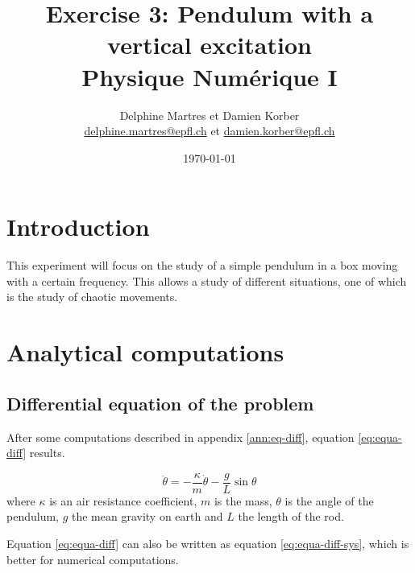 \documentclass[a4paper,12pt,twoside]{article}
\newcommand{\mail}[1]{{\href{mailto:#1}{#1}}}
\begin{document}
\title{Exercise 3: Pendulum with a vertical excitation\\{\small Physique Numérique I}}
\date{\today}
\author{Delphine Martres et Damien Korber\\{\small \mail{delphine.martres@epfl.ch} et \mail{damien.korber@epfl.ch}}}
\maketitle
\tableofcontents %
\newpage %
\baselineskip=16pt
\parindent=15pt
\parskip=5pt




\section{Introduction}
This experiment will focus on the study of a simple pendulum in a box moving with a certain frequency.
This allows a study of different situations, one of which is the study of chaotic movements.

\section{Analytical computations}
\subsection{Differential equation of the problem}
After some computations described in appendix \ref{ann:eq-diff}, equation \ref{eq:equa-diff} results.%

\begin{equation}
	\ddot{\theta} = -\frac{\kappa}{m}\dot{\theta} - \frac{g}{L}\sin\theta
	\label{eq:equa-diff}
\end{equation}
where $\kappa$ is an air resistance coefficient, $m$ is the mass, $\theta$ is the angle of the pendulum, $g$ the mean gravity on earth and $L$ the length of the rod.

Equation \ref{eq:equa-diff} can also be written as equation \ref{eq:equa-diff-sys}, which is better for numerical computations.
\end{document}
